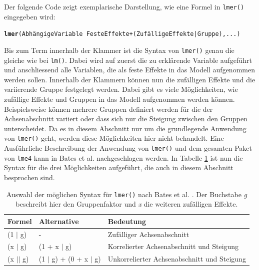 \documentclass[12pt]{article}\usepackage[]{graphicx}\usepackage[]{color}
\makeatletter
\newcommand{\hlkwd}[1]{\textcolor[rgb]{0.737,0.353,0.396}{\textbf{#1}}}%
\newenvironment{kframe}{%
 \def\at@end@of@kframe{}%
 \ifinner\ifhmode%
  \def\at@end@of@kframe{\end{minipage}}%
  \begin{minipage}{\columnwidth}%
 \fi\fi%
 \def\FrameCommand##1{\hskip\@totalleftmargin \hskip-\fboxsep
 \colorbox{shadecolor}{##1}\hskip-\fboxsep
     \hskip-\linewidth \hskip-\@totalleftmargin \hskip\columnwidth}%
 \MakeFramed {\advance\hsize-\width
   \@totalleftmargin\z@ \linewidth\hsize
   \@setminipage}}%
 {\par\unskip\endMakeFramed%
 \at@end@of@kframe}
\newenvironment{knitrout}{}{} %
\makeatother
\begin{document}
Der folgende Code zeigt exemplarische Darstellung, wie eine Formel in \texttt{lmer()} eingegeben wird:

\singlespacing
\begin{knitrout}
\color{fgcolor}\begin{kframe}
\begin{alltt}
\hlkwd{lmer}(Abhängige Variable ~ Feste Effekte + (Zufällige Effekte | Gruppe),...)
\end{alltt}
\end{kframe}
\end{knitrout}

Bis zum Term innerhalb der Klammer ist die Syntax von \texttt{lmer()} genau die gleiche wie bei \texttt{lm()}. Dabei wird auf zuerst die zu erklärende Variable aufgeführt und anschliessend alle Variablen, die als feste Effekte in das Modell aufgenommen werden sollen. Innerhalb der Klammern können nun die zufälligen Effekte und die variierende Gruppe festgelegt werden. Dabei gibt es viele Möglichkeiten, wie zufällige Effekte und Gruppen in das Modell aufgenommen werden können. Beispielsweise können mehrere Gruppen definiert werden für die der Achsenabschnitt variiert oder dass sich nur die Steigung zwischen den Gruppen unterscheidet. Da es in diesem Abschnitt nur um die grundlegende Anwendung von \texttt{lmer()} geht, werden diese Möglichkeiten hier nicht behandelt. Eine Ausführliche Beschreibung der Anwendung von \texttt{lmer()} und dem gesamten Paket von \texttt{lme4} kann in Bates et al. \citeyearpar{batesetal2015lme4} nachgeschlagen werden. In Tabelle \ref{tab:lmersyntax} ist nun die Syntax für die drei Möglichkeiten aufgeführt, die auch in diesem Abschnitt besprochen sind.
\begin{table}[ht] 
\centering
\begin{threeparttable}
\caption{Auswahl der möglichen Syntax für \texttt{lmer()} nach Bates et al. \citeyearpar{batesetal2015lme4}. Der Buchstabe \textit{g} beschreibt hier den Gruppenfaktor und \textit{x} die weiteren zufälligen Effekte.}
\begin{tabular}{lll}
 	\toprule
	Formel & Alternative & Bedeutung\\ 
  	\midrule
	(1 $|$ g)	& - 		& Zufälliger Achsenabschnitt \\
	(x $|$ g) 	& (1 + x $|$ g)	& Korrelierter Achsenabschnitt und Steigung \\
	(x $||$ g) & (1 $|$ g) + (0 + x $|$ g)	& Unkorrelierter Achsenabschnitt und Steigung\\
  	\bottomrule
\end{tabular}
\label{tab:lmersyntax}
\end{threeparttable}
\end{table}
\end{document}
